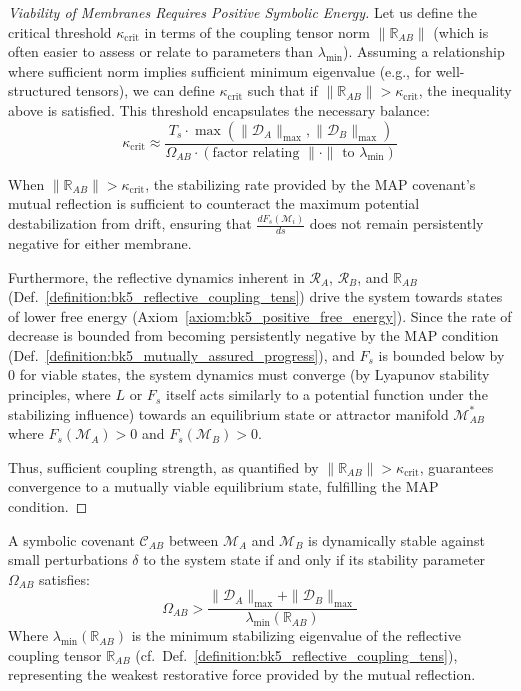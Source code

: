 \begin{proof}[Viability of Membranes Requires Positive Symbolic Energy]
Let us define the critical threshold \( \kappa_{\text{crit}} \) in terms of the coupling tensor norm \( \| \mathbb{R}_{AB} \| \) (which is often easier to assess or relate to parameters than \( \lambda_{\min} \)). Assuming a relationship where sufficient norm implies sufficient minimum eigenvalue (e.g., for well-structured tensors), we can define \( \kappa_{\text{crit}} \) such that if \( \| \mathbb{R}_{AB} \| > \kappa_{\text{crit}} \), the inequality above is satisfied. This threshold encapsulates the necessary balance:
\begin{equation}
\kappa_{\text{crit}} \approx \frac{T_s \cdot \max(\| \mathcal{D}_A \|_{\max}, \| \mathcal{D}_B \|_{\max})}{\Omega_{AB} \cdot (\text{factor relating } \| \cdot \| \text{ to } \lambda_{\min})}
\end{equation}

When \( \| \mathbb{R}_{AB} \| > \kappa_{\text{crit}} \), the stabilizing rate provided by the MAP covenant's mutual reflection is sufficient to counteract the maximum potential destabilization from drift, ensuring that \( \frac{dF_s(\mathscr{M}_i)}{ds} \) does not remain persistently negative for either membrane.

Furthermore, the reflective dynamics inherent in \( \mathcal{R}_A \), \( \mathcal{R}_B \), and \( \mathbb{R}_{AB} \) (Def.~\ref{definition:bk5_reflective_coupling_tens}) drive the system towards states of lower free energy (Axiom~\ref{axiom:bk5_positive_free_energy}). Since the rate of decrease is bounded from becoming persistently negative by the MAP condition (Def.~\ref{definition:bk5_mutually_assured_progress}), and \( F_s \) is bounded below by 0 for viable states, the system dynamics must converge (by Lyapunov stability principles, where \( L \) or \( F_s \) itself acts similarly to a potential function under the stabilizing influence) towards an equilibrium state or attractor manifold \( \mathscr{M}_{AB}^* \) where \( F_s(\mathscr{M}_A) > 0 \) and \( F_s(\mathscr{M}_B) > 0 \).

Thus, sufficient coupling strength, as quantified by \( \| \mathbb{R}_{AB} \| > \kappa_{\text{crit}} \), guarantees convergence to a mutually viable equilibrium state, fulfilling the MAP condition.
\end{proof}
\begin{theorem} \label{theorem:bk5_covenant_stability_theorem}
A symbolic covenant $\mathcal{C}_{AB}$ between $\mathscr{M}_A$ and $\mathscr{M}_B$ is dynamically stable against small perturbations $\delta$ to the system state if and only if its stability parameter $\Omega_{AB}$ satisfies:
\begin{equation}
\Omega_{AB} > \frac{\|\mathcal{D}_A\|_{\max} + \|\mathcal{D}_B\|_{\max}}{\lambda_{\min}(\mathbb{R}_{AB})}
\end{equation}
Where $\lambda_{\min}(\mathbb{R}_{AB})$ is the minimum stabilizing eigenvalue of the reflective coupling tensor $\mathbb{R}_{AB}$ (cf.~Def.~\ref{definition:bk5_reflective_coupling_tens}), representing the weakest restorative force provided by the mutual reflection.
\end{theorem}

